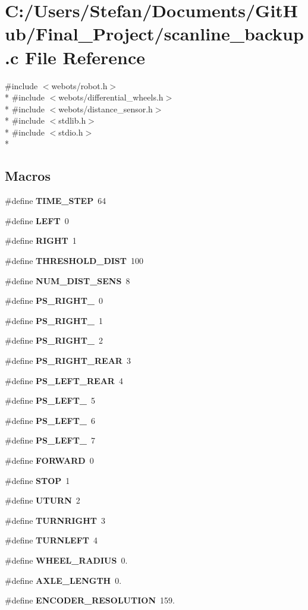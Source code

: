 \section{C\-:/\-Users/\-Stefan/\-Documents/\-Git\-Hub/\-Final\-\_\-\-Project/scanline\-\_\-backup.c File Reference}
\label{scanline__backup_8c}
{\ttfamily \#include $<$webots/robot.\-h$>$}\\*
{\ttfamily \#include $<$webots/differential\-\_\-wheels.\-h$>$}\\*
{\ttfamily \#include $<$webots/distance\-\_\-sensor.\-h$>$}\\*
{\ttfamily \#include $<$stdlib.\-h$>$}\\*
{\ttfamily \#include $<$stdio.\-h$>$}\\*
\subsection*{Macros}
\begin{DoxyCompactItemize}
\item 
\#define {\bf T\-I\-M\-E\-\_\-\-S\-T\-E\-P}~64
\item 
\#define {\bf L\-E\-F\-T}~0
\item 
\#define {\bf R\-I\-G\-H\-T}~1
\item 
\#define {\bf T\-H\-R\-E\-S\-H\-O\-L\-D\-\_\-\-D\-I\-S\-T}~100
\item 
\#define {\bf N\-U\-M\-\_\-\-D\-I\-S\-T\-\_\-\-S\-E\-N\-S}~8
\item 
\#define {\bf P\-S\-\_\-\-R\-I\-G\-H\-T\-\_}~0
\item 
\#define {\bf P\-S\-\_\-\-R\-I\-G\-H\-T\-\_}~1
\item 
\#define {\bf P\-S\-\_\-\-R\-I\-G\-H\-T\-\_}~2
\item 
\#define {\bf P\-S\-\_\-\-R\-I\-G\-H\-T\-\_\-\-R\-E\-A\-R}~3
\item 
\#define {\bf P\-S\-\_\-\-L\-E\-F\-T\-\_\-\-R\-E\-A\-R}~4
\item 
\#define {\bf P\-S\-\_\-\-L\-E\-F\-T\-\_}~5
\item 
\#define {\bf P\-S\-\_\-\-L\-E\-F\-T\-\_}~6
\item 
\#define {\bf P\-S\-\_\-\-L\-E\-F\-T\-\_}~7
\item 
\#define {\bf F\-O\-R\-W\-A\-R\-D}~0
\item 
\#define {\bf S\-T\-O\-P}~1
\item 
\#define {\bf U\-T\-U\-R\-N}~2
\item 
\#define {\bf T\-U\-R\-N\-R\-I\-G\-H\-T}~3
\item 
\#define {\bf T\-U\-R\-N\-L\-E\-F\-T}~4
\item 
\#define {\bf W\-H\-E\-E\-L\-\_\-\-R\-A\-D\-I\-U\-S}~0.
\item 
\#define {\bf A\-X\-L\-E\-\_\-\-L\-E\-N\-G\-T\-H}~0.
\item 
\#define {\bf E\-N\-C\-O\-D\-E\-R\-\_\-\-R\-E\-S\-O\-L\-U\-T\-I\-O\-N}~159.
\end{DoxyCompactItemize}
